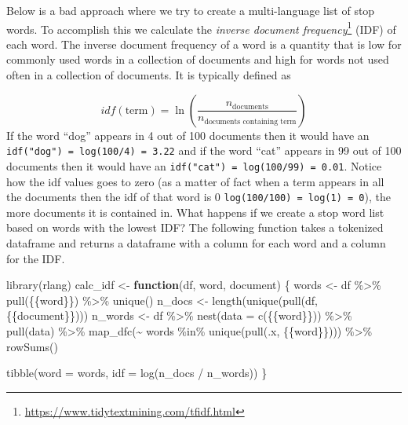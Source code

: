 \documentclass[
]{krantz}
\makeatletter
\newenvironment{Shaded}{\begin{snugshade}}{\end{snugshade}}
\newcommand{\AttributeTok}[1]{\textcolor[rgb]{0.77,0.63,0.00}{#1}}
\newcommand{\ControlFlowTok}[1]{\textcolor[rgb]{0.13,0.29,0.53}{\textbf{#1}}}
\newcommand{\FunctionTok}[1]{\textcolor[rgb]{0.00,0.00,0.00}{#1}}
\newcommand{\NormalTok}[1]{#1}
\newcommand{\OtherTok}[1]{\textcolor[rgb]{0.56,0.35,0.01}{#1}}
\newcommand{\SpecialCharTok}[1]{\textcolor[rgb]{0.00,0.00,0.00}{#1}}
\DeclareRobustCommand{\href}[2]{#2\footnote{\url{#1}}}
\renewcommand{\href}[2]{#2\footnote{\url{#1}}}
\newenvironment{kframe}{%
\medskip{}
\setlength{\fboxsep}{.8em}
 \def\at@end@of@kframe{}%
 \ifinner\ifhmode%
  \def\at@end@of@kframe{\end{minipage}}%
  \begin{minipage}{\columnwidth}%
 \fi\fi%
 \def\FrameCommand##1{\hskip\@totalleftmargin \hskip-\fboxsep
 \colorbox{shadecolor}{##1}\hskip-\fboxsep
     \hskip-\linewidth \hskip-\@totalleftmargin \hskip\columnwidth}%
 \MakeFramed {\advance\hsize-\width
   \@totalleftmargin\z@ \linewidth\hsize
   \@setminipage}}%
 {\par\unskip\endMakeFramed%
 \at@end@of@kframe}
\renewenvironment{Shaded}{\begin{kframe}}{\end{kframe}}
\makeatother
\begin{document}
Below is a bad approach where we try to create a multi-language list of stop words. To accomplish this we calculate the \href{https://www.tidytextmining.com/tfidf.html}{\emph{inverse document frequency}} (IDF) of each word. The inverse document frequency of a word is a quantity that is low for commonly used words in a collection of documents and high for words not used often in a collection of documents. It is typically defined as

\[idf(\text{term}) = \ln{\left(\frac{n_{\text{documents}}}{n_{\text{documents containing term}}}\right)}\]
If the word ``dog'' appears in 4 out of 100 documents then it would have an \texttt{idf("dog")\ =\ log(100/4)\ =\ 3.22} and if the word ``cat'' appears in 99 out of 100 documents then it would have an \texttt{idf("cat")\ =\ log(100/99)\ =\ 0.01}. Notice how the idf values goes to zero (as a matter of fact when a term appears in all the documents then the idf of that word is 0 \texttt{log(100/100)\ =\ log(1)\ =\ 0}), the more documents it is contained in.
What happens if we create a stop word list based on words with the lowest IDF? The following function takes a tokenized dataframe and returns a dataframe with a column for each word and a column for the IDF.

\begin{Shaded}
\begin{Highlighting}[]
\FunctionTok{library}\NormalTok{(rlang)}
\NormalTok{calc\_idf }\OtherTok{\textless{}{-}} \ControlFlowTok{function}\NormalTok{(df, word, document) \{}
\NormalTok{  words }\OtherTok{\textless{}{-}}\NormalTok{ df }\SpecialCharTok{\%\textgreater{}\%} \FunctionTok{pull}\NormalTok{(\{\{word\}\}) }\SpecialCharTok{\%\textgreater{}\%} \FunctionTok{unique}\NormalTok{()}
\NormalTok{  n\_docs }\OtherTok{\textless{}{-}} \FunctionTok{length}\NormalTok{(}\FunctionTok{unique}\NormalTok{(}\FunctionTok{pull}\NormalTok{(df, \{\{document\}\})))}
\NormalTok{  n\_words }\OtherTok{\textless{}{-}}\NormalTok{ df }\SpecialCharTok{\%\textgreater{}\%}
    \FunctionTok{nest}\NormalTok{(}\AttributeTok{data =} \FunctionTok{c}\NormalTok{(\{\{word\}\})) }\SpecialCharTok{\%\textgreater{}\%}
    \FunctionTok{pull}\NormalTok{(data) }\SpecialCharTok{\%\textgreater{}\%}
    \FunctionTok{map\_dfc}\NormalTok{(}\SpecialCharTok{\textasciitilde{}}\NormalTok{ words }\SpecialCharTok{\%in\%} \FunctionTok{unique}\NormalTok{(}\FunctionTok{pull}\NormalTok{(.x, \{\{word\}\}))) }\SpecialCharTok{\%\textgreater{}\%}
    \FunctionTok{rowSums}\NormalTok{()}
  
  \FunctionTok{tibble}\NormalTok{(}\AttributeTok{word =}\NormalTok{ words,}
         \AttributeTok{idf =} \FunctionTok{log}\NormalTok{(n\_docs }\SpecialCharTok{/}\NormalTok{ n\_words))}
\NormalTok{\}}
\end{Highlighting}
\end{Shaded}
\end{document}
